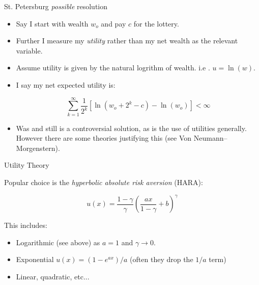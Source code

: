 \documentclass[11pt]{beamer}
\begin{document}
\begin{frame}{St. Petersburg \textit{possible} resolution}

\begin{itemize}

\item Say I start with wealth $w_o$ and pay $c$ for the lottery.

\item Further I measure my \textit{utility} rather than my net wealth as the relevant variable. 

\item Assume utility is given by the natural logrithm of wealth. i.e . $u=\ln(w)$. 

\item I say my net expected utility is:

$$ \sum _{k=1}^{\infty } \frac{1}{2^{k}} \left[\ln(w_o+2^{k}-c)-\ln(w_o)\right]<\infty $$

\item Was and still is a controversial solution, as is the use of utilities generally. However there are some theories justifying this (see Von Neumann–Morgenstern).

\end{itemize}

\end{frame}
\begin{frame}{Utility Theory}

Popular choice is the \textit{hyperbolic absolute risk aversion} (HARA):

$$ u(x) = \frac{1-\gamma}{\gamma} \left(\frac{ax}{1-\gamma} + b\right)^{\gamma} $$

This includes:

\begin{itemize}

\item Logarithmic (see above) as $a=1$ and $\gamma \rightarrow 0$.
\vfill
\item Exponential $u(x)=(1-e^{ax})/a$ (often they drop the $1/a$ term)
\vfill
\item Linear, quadratic, etc...

\end{itemize}


\end{frame}
\end{document}
